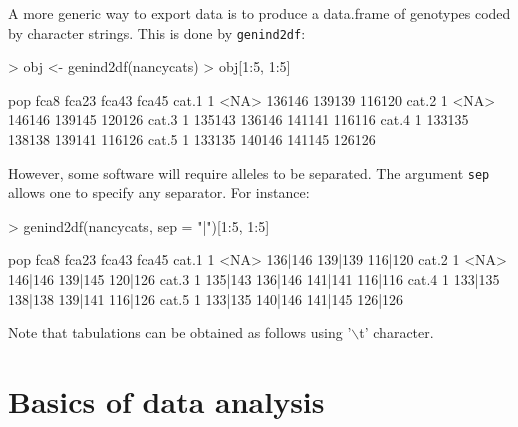 \documentclass{article}
\begin{document}


A more generic way to export data is to produce a data.frame of genotypes
coded by character strings.
This is done by \texttt{genind2df}:
\begin{Schunk}
\begin{Sinput}
> obj <- genind2df(nancycats)
> obj[1:5, 1:5]
\end{Sinput}
\begin{Soutput}
      pop   fca8  fca23  fca43  fca45
cat.1   1   <NA> 136146 139139 116120
cat.2   1   <NA> 146146 139145 120126
cat.3   1 135143 136146 141141 116116
cat.4   1 133135 138138 139141 116126
cat.5   1 133135 140146 141145 126126
\end{Soutput}
\end{Schunk}

\noindent However, some software will require alleles to be
separated.
The argument \texttt{sep} allows one to specify any separator.
For instance:
\begin{Schunk}
\begin{Sinput}
> genind2df(nancycats, sep = "|")[1:5, 1:5]
\end{Sinput}
\begin{Soutput}
      pop    fca8   fca23   fca43   fca45
cat.1   1    <NA> 136|146 139|139 116|120
cat.2   1    <NA> 146|146 139|145 120|126
cat.3   1 135|143 136|146 141|141 116|116
cat.4   1 133|135 138|138 139|141 116|126
cat.5   1 133|135 140|146 141|145 126|126
\end{Soutput}
\end{Schunk}

Note that tabulations can be obtained as follows using '{$\backslash$}t' character.






\section{Basics of data analysis}

\end{document}
